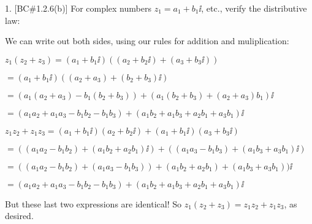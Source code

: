 



\loadmsbm

\dl{\displaystyle}
\ctln{\centerline}
\ssk{\smallskip}
\msk{\medskip}
\bsk{\bigskip}
\hhh{\hskip.72in}
\hhhh{\hskip.3in}

\overfullrule=0pt
\nopagenumbers



\msk


\bsk

\bsk

\item{1.} [BC\#1.2.6(b)] For complex numbers $z_1=a_1+b_1\ii$, etc., verify the
distributive law:

\msk


\msk

\item{} We can write out both sides, using our rules for addition and muliplication:

\ssk

\item{} $z_1(z_2+z_3) = (a_1+b_1\ii)((a_2+b_2\ii)+(a_3+b_3\ii))$

\hhh $= (a_1+b_1\ii)((a_2+a_3)+(b_2+b_3)\ii)$

\hhh $= (a_1(a_2+a_3)-b_1(b_2+b_3))+(a_1(b_2+b_3)+(a_2+a_3)b_1)\ii$

\hhh $= (a_1a_2+a_1a_3-b_1b_2-b_1b_3)+(a_1b_2+a_1b_3+a_2b_1+a_3b_1)\ii$

\ssk

\item{} $z_1z_2+z_1z_3 = (a_1+b_1\ii)(a_2+b_2\ii)+(a_1+b_1\ii)(a_3+b_3\ii)$

\hhh $ =
((a_1a_2-b_1b_2)+(a_1b_2+a_2b_1)\ii)+((a_1a_3-b_1b_3)+(a_1b_3+a_3b_1)\ii)$

\hhh $ =
((a_1a_2-b_1b_2)+(a_1a_3-b_1b_3)) +(a_1b_2+a_2b_1)+(a_1b_3+a_3b_1))\ii$

\hhh $ = 
(a_1a_2+a_1a_3-b_1b_2-b_1b_3) +(a_1b_2+a_1b_3+a_2b_1+a_3b_1)\ii$

\ssk

\item{} But these last two expressions are identical! So  $z_1(z_2+z_3)=z_1z_2+z_1z_3$, as desired.

